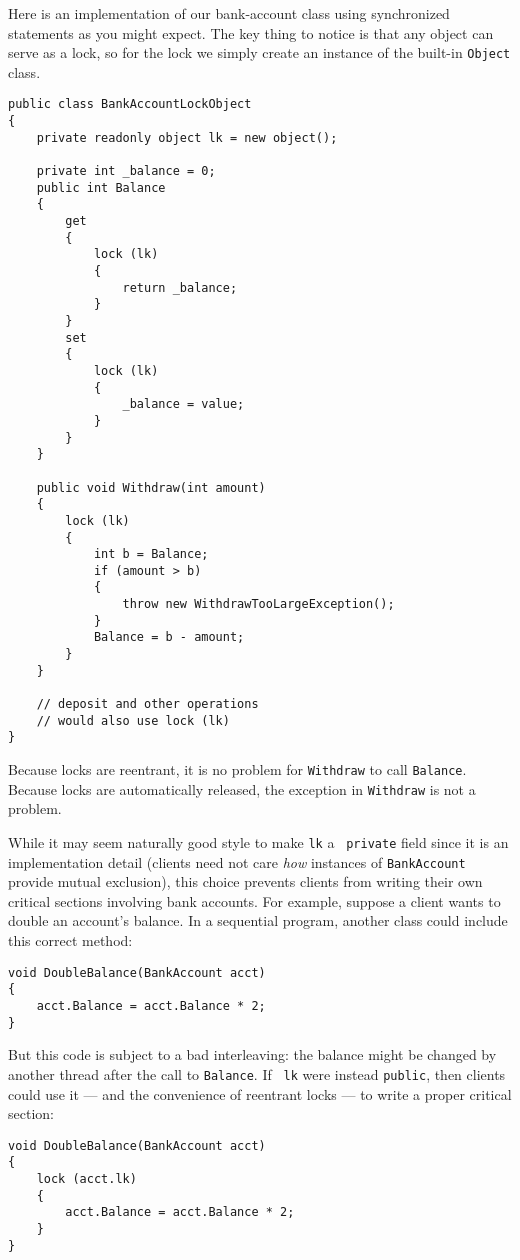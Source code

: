 \documentclass[10pt]{article}
\begin{document}
Here is an implementation of our bank-account class using synchronized
statements as you might expect. The key thing to notice is that any
object can serve as a lock, so for the lock we simply create an
instance of the built-in {\tt Object} class.
\begin{verbatim}
public class BankAccountLockObject
{
    private readonly object lk = new object();

    private int _balance = 0;
    public int Balance
    {
        get
        {
            lock (lk)
            {
                return _balance;
            }
        }
        set
        {
            lock (lk)
            {
                _balance = value;
            }
        }
    }

    public void Withdraw(int amount)
    {
        lock (lk)
        {
            int b = Balance;
            if (amount > b)
            {
                throw new WithdrawTooLargeException();
            }
            Balance = b - amount;
        }
    }

    // deposit and other operations
    // would also use lock (lk)
}
\end{verbatim}
Because locks are reentrant, it is no problem for {\tt Withdraw} to
call {\tt Balance}.  Because locks are automatically released, 
the exception in {\tt Withdraw} is not a problem.

While it may seem naturally good style to make {\tt lk} a {\tt
  private} field since it is an implementation detail (clients need
not care \emph{how} instances of {\tt BankAccount} provide mutual
exclusion), this choice prevents clients from writing their own
critical sections involving bank accounts. For example, suppose a
client wants to double an account's balance.  In a sequential program,
another class could include this correct method:
\begin{verbatim}
void DoubleBalance(BankAccount acct)
{
    acct.Balance = acct.Balance * 2;
}
\end{verbatim}
But this code is subject to a bad interleaving: the balance might be
changed by another thread after the call to {\tt Balance}.  If {\tt
  lk} were instead {\tt public}, then clients could use it --- and the
convenience of reentrant locks --- to write a proper critical
section:
\begin{verbatim}
void DoubleBalance(BankAccount acct)
{
    lock (acct.lk)
    {
        acct.Balance = acct.Balance * 2;
    }
}
\end{verbatim}
\end{document}
